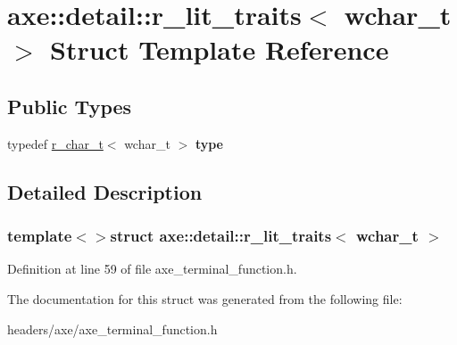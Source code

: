 \hypertarget{structaxe_1_1detail_1_1r__lit__traits_3_01wchar__t_01_4}{\section{axe\+:\+:detail\+:\+:r\+\_\+lit\+\_\+traits$<$ wchar\+\_\+t $>$ Struct Template Reference}
\label{structaxe_1_1detail_1_1r__lit__traits_3_01wchar__t_01_4}
}
\subsection*{Public Types}
\begin{DoxyCompactItemize}
\item 
\hypertarget{structaxe_1_1detail_1_1r__lit__traits_3_01wchar__t_01_4_acf44ebfa8434cf4cf2188a9b96831a66}{typedef \hyperlink{classaxe_1_1r__char__t}{r\+\_\+char\+\_\+t}$<$ wchar\+\_\+t $>$ {\bfseries type}}\label{structaxe_1_1detail_1_1r__lit__traits_3_01wchar__t_01_4_acf44ebfa8434cf4cf2188a9b96831a66}

\end{DoxyCompactItemize}


\subsection{Detailed Description}
\subsubsection*{template$<$$>$struct axe\+::detail\+::r\+\_\+lit\+\_\+traits$<$ wchar\+\_\+t $>$}



Definition at line 59 of file axe\+\_\+terminal\+\_\+function.\+h.



The documentation for this struct was generated from the following file\+:\begin{DoxyCompactItemize}
\item 
headers/axe/axe\+\_\+terminal\+\_\+function.\+h\end{DoxyCompactItemize}
